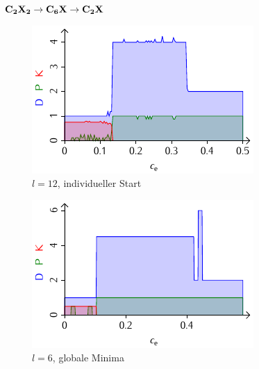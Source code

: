 \documentclass{beamer}
\begin{document}
	\begin{frame}{$\bf C_{\boldsymbol 2}X_{\boldsymbol 2} \rightarrow C_{\boldsymbol 6}X \rightarrow C_{\boldsymbol 2}X$}
		\begin{figure}
			\scriptsize
			\begin{minipage}{0.48\textwidth}
				\centering
				\includegraphics[width=\textwidth]{Abbildungen/C2X2-C6X-C2X.pdf} \\
				$l = 12$, individueller Start
			\end{minipage}
			\hfill
			\begin{minipage}{0.48\textwidth}
				\centering
				\includegraphics[width=\textwidth]{Abbildungen/C2X2-C6X-C2X-exact.pdf} \\
				$l = 6$, globale Minima
			\end{minipage}
		\end{figure}
		\begin{itemize}

\end{itemize}
\end{frame}
\end{document}

